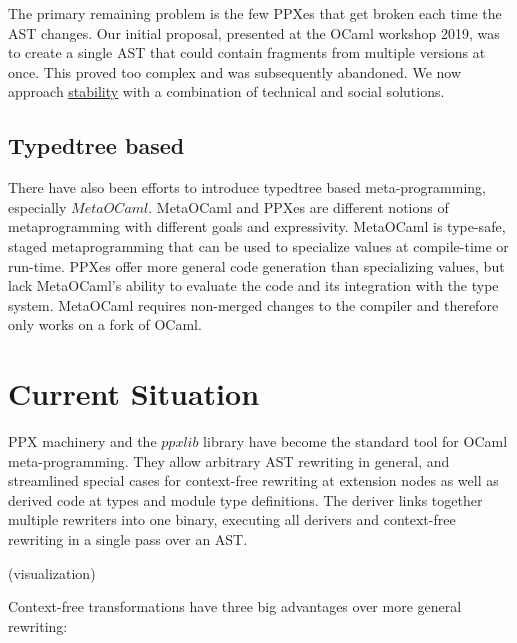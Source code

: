 \documentclass[10pt, a4paper, twocolumn]{article}
\begin{document}
The primary remaining problem is the few PPXes that get broken each time the AST
changes. Our initial proposal, presented at the OCaml workshop
2019\cite{workshop2019}, was to create a single AST that could contain fragments
from multiple versions at once. This proved too complex and was subsequently
abandoned. We now approach \hyperref[stability]{stability} with a combination of
technical and social solutions.

\subsection{Typedtree based}

There have also been efforts to introduce typedtree based meta-programming,
especially $MetaOCaml$\cite{metaocaml}. MetaOCaml and PPXes are different
notions of metaprogramming with different goals and expressivity. MetaOCaml is
type-safe, staged metaprogramming that can be used to specialize values at
compile-time or run-time. PPXes offer more general code generation than
specializing values, but lack MetaOCaml's ability to evaluate the code and its
integration with the type system. MetaOCaml requires non-merged changes
to the compiler and therefore only works on a fork of OCaml.

\section{Current Situation}

PPX machinery and the $ppxlib$ library have become the standard tool for OCaml
meta-programming. They allow arbitrary AST rewriting in general, and streamlined
special cases for context-free rewriting at extension nodes as well as derived
code at types and module type definitions. The deriver links together multiple
rewriters into one binary, executing all derivers and context-free rewriting in
a single pass over an AST.

\vspace{20pt}

(visualization)

\vspace{25pt}

Context-free transformations have three big advantages over more general rewriting:
\end{document}
